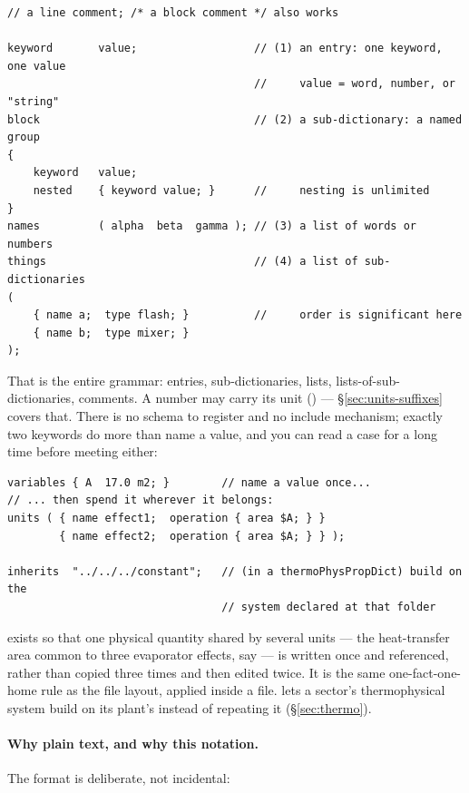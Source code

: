 \documentclass[11pt,a4paper]{article}
\begin{document}
\begin{lstlisting}[language=dict]
// a line comment; /* a block comment */ also works

keyword       value;                  // (1) an entry: one keyword, one value
                                      //     value = word, number, or "string"
block                                 // (2) a sub-dictionary: a named group
{
    keyword   value;
    nested    { keyword value; }      //     nesting is unlimited
}
names         ( alpha  beta  gamma ); // (3) a list of words or numbers
things                                // (4) a list of sub-dictionaries
(
    { name a;  type flash; }          //     order is significant here
    { name b;  type mixer; }
);
\end{lstlisting}

That is the entire grammar: entries, sub-dictionaries, lists,
lists-of-sub-dictionaries, comments.  A number may carry its unit
() --- \S\ref{sec:units-suffixes} covers that.  There is
no schema to register and no include mechanism; exactly two keywords do
more than name a value, and you can read a case for a long time before
meeting either:

\begin{lstlisting}[language=dict]
variables { A  17.0 m2; }        // name a value once...
// ... then spend it wherever it belongs:
units ( { name effect1;  operation { area $A; } }
        { name effect2;  operation { area $A; } } );

inherits  "../../../constant";   // (in a thermoPhysPropDict) build on the
                                 // system declared at that folder
\end{lstlisting}

\noindent {} exists so that one physical quantity shared
by several units --- the heat-transfer area common to three evaporator
effects, say --- is written once and referenced, rather than copied
three times and then edited twice.  It is the same one-fact-one-home
rule as the file layout, applied inside a file.   lets a
sector's thermophysical system build on its plant's instead of repeating
it (\S\ref{sec:thermo}).

\paragraph{Why plain text, and why this notation.}  The format is
deliberate, not incidental:
\end{document}

